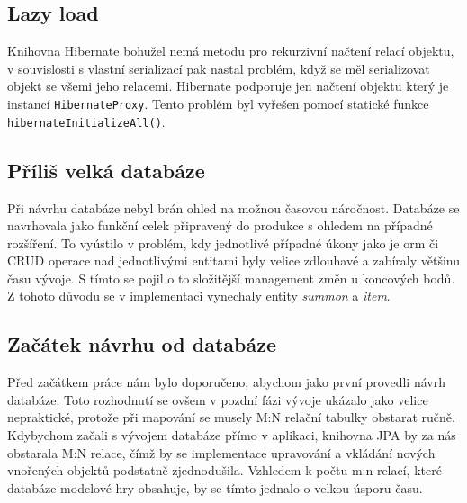 \subsection{Lazy load}
Knihovna Hibernate bohužel nemá metodu pro rekurzivní načtení relací objektu, v souvislosti s vlastní serializací pak nastal problém, když se měl serializovat objekt se všemi jeho relacemi. Hibernate podporuje jen načtení objektu který je instancí \texttt{HibernateProxy}. Tento problém byl vyřešen pomocí statické funkce \texttt{hibernateInitializeAll()}. 

\subsection{Příliš velká databáze}
Při návrhu databáze nebyl brán ohled na možnou časovou náročnost. Databáze se navrhovala jako funkční celek připravený do produkce s ohledem na případné rozšíření. To vyústilo v problém, kdy jednotlivé případné úkony jako je \gls{orm} či CRUD operace nad jednotlivými entitami byly velice zdlouhavé a zabíraly většinu času vývoje. S tímto se pojil o to složitější management změn u koncových bodů. Z tohoto důvodu se v implementaci vynechaly entity \textit{summon} a \textit{item}.

\subsection{Začátek návrhu od databáze}
Před začátkem práce nám bylo doporučeno, abychom jako první provedli návrh databáze. Toto rozhodnutí se ovšem v pozdní fázi vývoje ukázalo jako velice nepraktické, protože při mapování se musely M:N relační tabulky obstarat ručně. Kdybychom začali s vývojem databáze přímo v aplikaci, knihovna JPA  by za nás obstarala M:N relace, čímž by se implementace upravování a vkládání nových vnořených objektů podstatně zjednodušila. Vzhledem k počtu m:n relací, které databáze modelové hry obsahuje, by se tímto jednalo o velkou úsporu času.